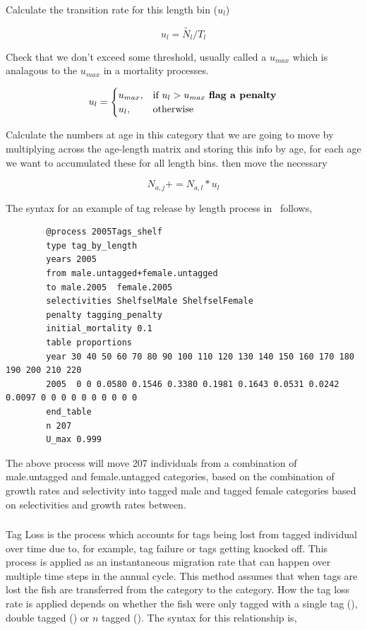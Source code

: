 Calculate the transition rate for this length bin ($u_l$)

$$u_{l} = \tilde{N_l} / T_l$$



Check that we don't exceed some threshold, usually called a $u_{max}$ which is analagous to the $u_{max}$ in a mortality processes.

\[
u_{l} =
\begin{cases}
u_{max},& \text{if } u_{l} > u_{max} \text{ \textbf{flag a penalty}}\\
u_{l},  & \text{otherwise}
\end{cases}
\]

Calculate the numbers at age in this category that we are going to move by multiplying across the age-length matrix and storing this info by age, for each age we want to accumulated these for all length bins. then move the necessary

$$N_{a,j} += N_{a,l} * u_l$$

The syntax for an example of tag release by length process in \CNAME\ follows,
{\small{\begin{verbatim}
		@process 2005Tags_shelf
		type tag_by_length
		years 2005
		from male.untagged+female.untagged
		to male.2005  female.2005
		selectivities ShelfselMale ShelfselFemale
		penalty tagging_penalty
		initial_mortality 0.1
		table proportions
		year 30 40 50 60 70 80 90 100 110 120 130 140 150 160 170 180 190 200 210 220
		2005  0 0 0.0580 0.1546 0.3380 0.1981 0.1643 0.0531 0.0242 0.0097 0 0 0 0 0 0 0 0 0 0
		end_table
		n 207
		U_max 0.999
		\end{verbatim}}}

The above process will move 207 individuals from a combination of male.untagged and female.untagged categories, based on the combination of growth rates and selectivity into tagged male and tagged female categories based on selectivities and growth rates between.

\subsubsection{}

Tag Loss is the process which accounts for tags being lost from tagged individual over time due to, for example, tag failure or tags getting knocked off. This process is applied as an instantaneous migration rate that can happen over multiple time steps in the annual cycle. This method assumes that when tags are lost the fish are transferred from the  category to the  category. How the tag loss rate is applied depends on whether the fish were only tagged with a single tag (), double tagged () or $n$ tagged (). The syntax for this relationship is,

